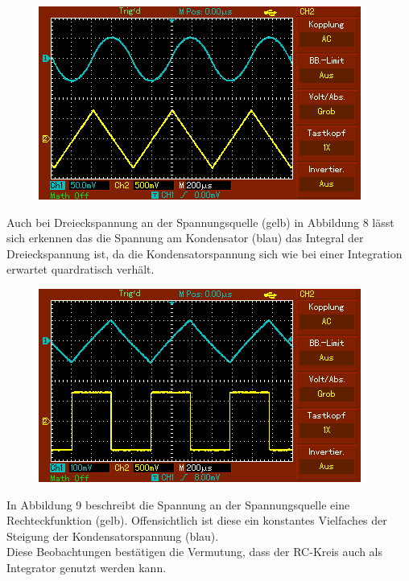 	 
	 \begin{figure}[H]
	 	\centering
	 	\caption{}
	 	\includegraphics[width=\linewidth-70pt,height=\textheight-70pt,keepaspectratio]{content/MAP003.png}
	 	\label{fig:Dreieck}
	 \end{figure}
	 Auch bei Dreieckspannung an der Spannungsquelle (gelb) in Abbildung 8 lässt sich erkennen das die Spannung am Kondensator (blau) das Integral der Dreieckspannung ist, da die Kondensatorspannung sich wie bei einer Integration erwartet quardratisch verhält.
	 
	 \begin{figure}[H]
	 	\centering
	 	\caption{}
	 	\includegraphics[width=\linewidth-70pt,height=\textheight-70pt,keepaspectratio]{content/MAP004.png}
	 	\label{fig:Rechteck}
	 \end{figure}
	 In Abbildung 9 beschreibt die Spannung an der Spannungsquelle eine Rechteckfunktion (gelb). Offensichtlich ist diese ein konstantes Vielfaches der Steigung der Kondensatorspannung (blau).\\
	 
	 Diese Beobachtungen bestätigen die Vermutung, dass der RC-Kreis auch als Integrator genutzt werden kann.
	 
